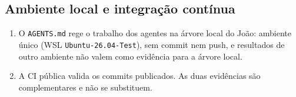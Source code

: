 \subsection{Ambiente local e integração contínua}

\begin{enumerate}
  \item O \texttt{AGENTS.md} rege o trabalho dos agentes na árvore local do João: ambiente único (WSL
        \texttt{Ubuntu-26.04-Test}), sem commit nem push, e resultados de outro ambiente não valem como evidência
        para a árvore local.
  \item A CI pública valida os commits publicados. As duas evidências são complementares e não se substituem.
\end{enumerate}